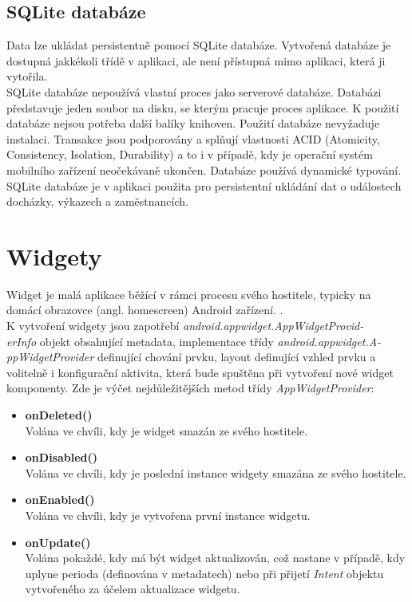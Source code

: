 \documentclass{diplomka}
\begin{document}
\subsection*{SQLite databáze}
Data lze ukládat persistentně pomocí SQLite\cite{sqlite} databáze. Vytvořená databáze je dostupná jakkékoli třídě v aplikaci, ale není přístupná mimo aplikaci, která ji vytořila. \\ \indent
SQLite databáze nepoužívá vlastní proces jako serverové databáze. Databázi představuje jeden soubor na disku, se kterým pracuje proces aplikace. K použití databáze nejsou potřeba další balíky knihoven. Použití databáze nevyžaduje instalaci. Transakce jsou podporovány a splňují vlastnosti ACID (Atomicity, Consistency, Isolation, Durability) a to i v případě, kdy je operační systém mobilního zařízení neočekávaně ukončen. Databáze používá dynamické typování. \\ \indent
SQLite databáze je v aplikaci použita pro persistentní ukládání dat o událostech docházky, výkazech a zaměstnancích.


\section{Widgety}
 Widget je malá aplikace běžící v rámci procesu svého hostitele, typicky na domácí obrazovce (angl. homescreen) Android zařízení. \cite{androidinaction}.\\ \indent
K vytvoření widgety jsou zapotřebí \emph{android.appwidget.AppWidgetProvid-\\erInfo} objekt obsahující metadata,  implementace třídy \emph{android.appwidget.A-\\ppWidgetProvider} definující chování prvku, layout definující vzhled prvku a 
volitelně i konfigurační aktivita, která bude spuštěna při vytvoření nové widget komponenty. 
Zde je výčet nejdůležitějších metod třídy \emph{AppWidgetProvider}:
\begin{itemize}[]
\item \textbf{onDeleted()}\\
Volána ve chvíli, kdy je widget smazán ze svého hostitele.
\item \textbf{onDisabled()}\\
Volána ve chvíli, kdy je poslední instance widgety smazána ze svého hostitele.
\item \textbf{onEnabled()}\\
Volána ve chvíli, kdy je vytvořena první instance widgetu.
\item \textbf{onUpdate()}\\
Volána pokaždé, kdy má být widget aktualizován, což nastane v případě, kdy uplyne perioda (definována v metadatech) nebo při přijetí \emph{Intent} objektu vytvořeného za účelem aktualizace widgetu. 
\end{itemize}
\end{document}
